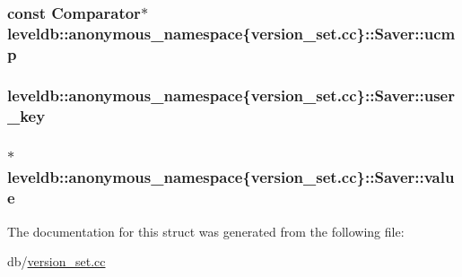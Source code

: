 \subsubsection[{ucmp}]{\setlength{\rightskip}{0pt plus 5cm}const {\bf Comparator}$\ast$ leveldb\+::anonymous\+\_\+namespace\{version\+\_\+set.\+cc\}\+::Saver\+::ucmp}\label{structleveldb_1_1anonymous__namespace_02version__set_8cc_03_1_1_saver_aa68e90a0813b95dec9e0dafeaca94388}
\hypertarget{structleveldb_1_1anonymous__namespace_02version__set_8cc_03_1_1_saver_a0ee60ba912fe7158e98a81e63d5df580}{}
\subsubsection[{user\+\_\+key}]{ leveldb\+::anonymous\+\_\+namespace\{version\+\_\+set.\+cc\}\+::Saver\+::user\+\_\+key}\label{structleveldb_1_1anonymous__namespace_02version__set_8cc_03_1_1_saver_a0ee60ba912fe7158e98a81e63d5df580}
\hypertarget{structleveldb_1_1anonymous__namespace_02version__set_8cc_03_1_1_saver_a97ff634a4d901d4676f1aa450ab10a4d}{}
\subsubsection[{value}]{$\ast$ leveldb\+::anonymous\+\_\+namespace\{version\+\_\+set.\+cc\}\+::Saver\+::value}\label{structleveldb_1_1anonymous__namespace_02version__set_8cc_03_1_1_saver_a97ff634a4d901d4676f1aa450ab10a4d}


The documentation for this struct was generated from the following file\+:\begin{DoxyCompactItemize}
\item 
db/\hyperlink{version__set_8cc}{version\+\_\+set.\+cc}\end{DoxyCompactItemize}
